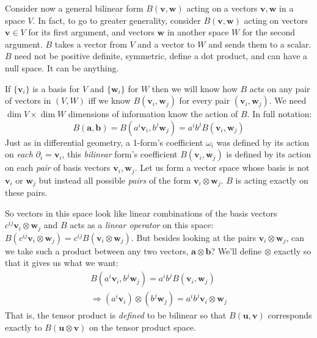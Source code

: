 	Consider now a general bilinear form $B(\mathbf v, \mathbf w)$ acting on a vectors $\mathbf v,\mathbf w$ in a space $V$. In fact, to go to greater generality, consider $B(\mathbf v, \mathbf w)$ acting on vectors $\mathbf v \in V$ for its first argument, and vectors $\mathbf w$ in another space $W$ for the second argument. $B$ takes a vector from $V$ and a vector to $W$ and sends them to a scalar. $B$ need not be positive definite, symmetric, define a dot product, and can have a null space. It can be anything.
	
	If $\{\mathbf v_i \}$ is a basis for $V$ and $\{\mathbf w_i \}$ for $W$ then we will know how $B$ acts on any pair of vectors in $(V, W)$ iff we know $B(\mathbf v_i, \mathbf w_j)$ for every pair $(\mathbf v_i, \mathbf w_j)$. We need $\dim V \times \dim W$ dimensions of information know the action of $B$.
	In full notation:
	\begin{equation}
		B(\mathbf a, \mathbf b) = B(a^i \mathbf v_i, b^j \mathbf w_j) = a^i b^j B(\mathbf v_i, \mathbf w_j)
	\end{equation}
	Just as in differential geometry, a 1-form's coefficient $\omega_i$ was defined by its action on \emph{each} $\partial_i = \mathbf v_i$, this \emph{bilinear} form's coefficient $B(\mathbf v_i, \mathbf w_j)$ is defined by its action on each \emph{pair} of basis vectors $\mathbf v_i, \mathbf w_j$. Let us form a vector space whose basis is not $\mathbf v_i$ or $\mathbf w_j$ but instead all possible \emph{pairs} of the form $\mathbf v_i \otimes \mathbf w_j$. $B$ is acting exactly on these pairs. 
	
	So vectors in this space look like linear combinations of the basis vectors $c^{ij} \mathbf v_i \otimes \mathbf w_j$ and $B$ acts as a \emph{linear operator} on this space: $B(c^{ij} \mathbf v_i \otimes \mathbf w_j) = c^{ij} B(\mathbf v_i \otimes \mathbf w_j)$. But besides looking at the pairs $\mathbf v_i \otimes \mathbf w_j$, can we take such a product between any two vectors, $\mathbf a \otimes \mathbf b$? We'll define $\otimes$ exactly so that it gives us what we want:
	\begin{align*}
		B(a^i \mathbf v_i, b^j \mathbf w_j) = a^i b^j B(\mathbf v_i, \mathbf w_j)\\ \Rightarrow (a^i \mathbf v_i) \otimes (b^j \mathbf w_j) = a^i b^j \mathbf v_i \otimes \mathbf w_j
	\end{align*}
	That is, the tensor product is \emph{defined} to be bilinear so that $B(\mathbf u, \mathbf v)$ corresponds exactly to $B(\mathbf u \otimes \mathbf v)$ on the tensor product space.
	
